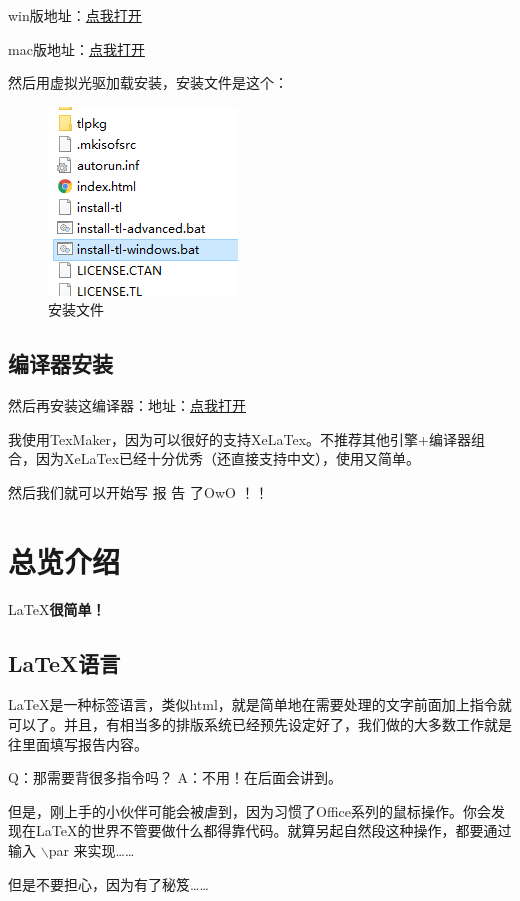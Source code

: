 \documentclass[12pt,a4paper,oneside]{book}
\begin{document}
win版地址：\href{http://pan.baidu.com/share/link?uk=705221041&shareid=72337831&third=0&adapt=pc&from=wapforcetoweb}{点我打开}

mac版地址：\href{http://pan.baidu.com/share/link?uk=2064390295&shareid=584901926&third=0&adapt=pc&fr=ftw}{点我打开}


\par

然后用虚拟光驱加载安装，安装文件是这个：
\par

\begin{figure}[htp] 
\centering 
\includegraphics[scale=0.75]{Figures/tl.png}
\caption{安装文件}%
\label{pic:tl}
\end{figure}
\vspace{2em}

\section{编译器安装}
\par
然后再安装这编译器：地址：\href{http://www.xm1math.net/texmaker/download.html}{点我打开}

\par
我使用TexMaker，因为可以很好的支持XeLaTex。不推荐其他引擎+编译器组合，因为XeLaTex已经十分优秀（还直接支持中文），使用又简单。
\par
然后我们就可以开始写 报 告 了OwO ！！
\chapter{总览介绍}
\begin{center}
\LaTeX {\bfseries {很简单！}}
\end{center}
\vspace{2em}
\section{LaTeX语言}
\LaTeX 是一种{\color{cyan}标签语言}，类似html，就是简单地在需要处理的文字前面加上指令就可以了。并且，有相当多的排版系统已经预先设定好了，我们做的大多数工作就是往里面填写报告内容。
\par
Q：那需要背很多指令吗？ A：{\color{cyan}不用}！在后面会讲到。
\par
但是，刚上手的小伙伴可能会被虐到，因为习惯了Office系列的鼠标操作。你会发现在\LaTeX 的世界不管要做什么都得靠{\color{cyan}代码}。就算另起自然段这种操作，都要通过输入 $\backslash$par 来实现……
\par
但是不要担心，因为有了秘笈……
\end{document}
